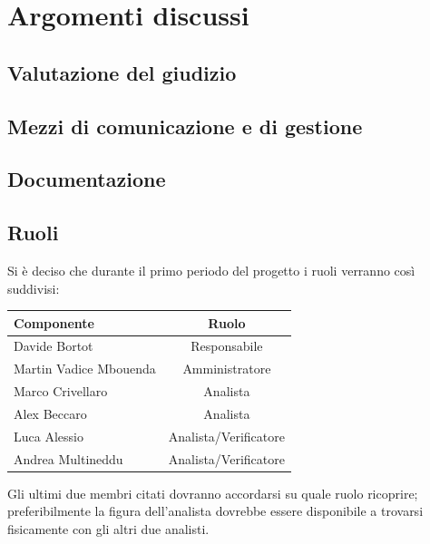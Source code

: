 \documentclass[a4paper,11pt]{article}
\begin{document}
	\newpage
	\section{Argomenti discussi}
		\subsection{Valutazione del giudizio}
		
		
		
		\subsection{Mezzi di comunicazione e di gestione}
		
		
		
		\subsection{Documentazione}
		
		
		\subsection{Ruoli}
		Si è deciso che durante il primo periodo del progetto i ruoli verranno così suddivisi:
		\begin{table}[h!]			
		\begin{center}
			\begin{tabular}{l c}
			\textbf{Componente} & \textbf{Ruolo}\\
			\midrule
			Davide Bortot & Responsabile\\
			Martin Vadice Mbouenda & Amministratore\\
			Marco Crivellaro & Analista\\
			Alex Beccaro & Analista\\
			Luca Alessio & Analista/Verificatore\\
			Andrea Multineddu & Analista/Verificatore\\
			\midrule
			\end{tabular}
		\end{center}
		\end{table}
		\newline
		Gli ultimi due membri citati dovranno accordarsi su quale ruolo ricoprire; preferibilmente la figura dell'analista dovrebbe essere disponibile a trovarsi fisicamente con gli altri due analisti.
\end{document}
